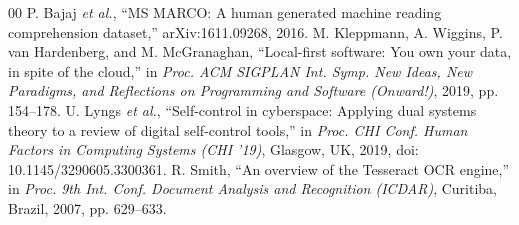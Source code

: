 \documentclass[conference]{IEEEtran}
\begin{document}
\begin{thebibliography}{00}
 P. Bajaj \textit{et al.}, ``MS MARCO: A human generated machine reading comprehension dataset,'' arXiv:1611.09268, 2016.
 M. Kleppmann, A. Wiggins, P. van Hardenberg, and M. McGranaghan, ``Local-first software: You own your data, in spite of the cloud,'' in \textit{Proc. ACM SIGPLAN Int. Symp. New Ideas, New Paradigms, and Reflections on Programming and Software (Onward!)}, 2019, pp. 154--178.
 U. Lyngs \textit{et al.}, ``Self-control in cyberspace: Applying dual systems theory to a review of digital self-control tools,'' in \textit{Proc. CHI Conf. Human Factors in Computing Systems (CHI '19)}, Glasgow, UK, 2019, doi: 10.1145/3290605.3300361.
 R. Smith, ``An overview of the Tesseract OCR engine,'' in \textit{Proc. 9th Int. Conf. Document Analysis and Recognition (ICDAR)}, Curitiba, Brazil, 2007, pp. 629--633.
\end{thebibliography}
\end{document}

